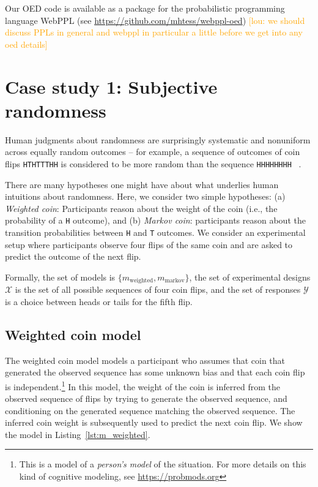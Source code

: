 \documentclass{article}
\newcommand{\lou}[1]{\textcolor{orange}{[lou: #1]}}
\begin{document}
Our OED code is available as a package for the probabilistic programming language WebPPL \cite{dippl} (see  \url{https://github.com/mhtess/webppl-oed})
\lou{we should discuss PPLs in general and webppl in particular a little before we get into any oed details}

\section{Case study 1: Subjective randomness}
\label{s:tutorial}

Human judgments about randomness are surprisingly systematic and nonuniform across equally random outcomes -- for example, a sequence of outcomes of coin flips \lstinline{HTHTTTHH} is considered to be more random than the sequence \lstinline{HHHHHHHH} ~\cite{goodfellow38:jep, griffiths01:cogsci}.

There are many hypotheses one might have about what underlies human intuitions about randomness.
Here, we consider two simple hypotheses: (a) \emph{Weighted coin}: Participants reason about the weight of the coin (i.e., the probability of a \lstinline{H} outcome), and (b) \emph{Markov coin}: participants reason about the transition probabilities between \lstinline{H} and \lstinline{T} outcomes.
We consider an experimental setup where participants observe four flips of the same coin and are asked to predict the outcome of the next flip.

Formally, the set of models is $\{m_{\text{weighted}}, m_{\text{markov}}\}$, the set of experimental designs $\mathcal{X}$ is the set of all possible sequences of four coin flips, and the set of responses $\mathcal{Y}$ is a choice between heads or tails for the fifth flip.

\subsection{Weighted coin model}
\label{s:tutorial:sss:biased}

The weighted coin model models a participant who assumes that coin that generated the observed sequence has some unknown bias and that each coin flip is independent.\footnote{This is a model of a \emph{person's model} of the situation. For more details on this kind of cognitive modeling, see \url{https://probmods.org}}
In this model, the weight of the coin is inferred from the observed sequence of flips by trying to generate the observed sequence, and conditioning on the generated sequence matching the observed sequence.
The inferred coin weight is subsequently used to predict the next coin flip. We show the model in Listing~\ref{lst:m_weighted}.
\end{document}
